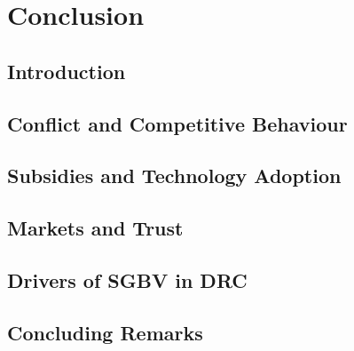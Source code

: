 \chapter{Conclusion}
\label{chap:conclusion}

\section{Introduction}



\section{Conflict and Competitive Behaviour}

\section{Subsidies and Technology Adoption}

\section{Markets and Trust}

\section{Drivers of SGBV in DRC}

\section{Concluding Remarks}


